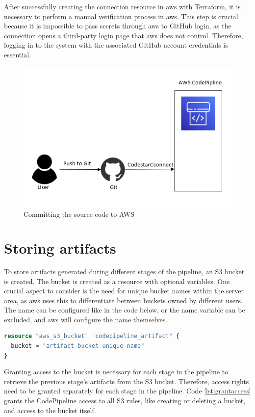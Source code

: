 After successfully creating the connection resource in \acrshort{aws} with Terraform, it is necessary to perform a manual verification process in \acrshort{aws}. This step is crucial because it is impossible to pass secrets through \acrshort{aws} to GitHub login, as the connection opens a third-party login page that \acrshort{aws} does not control. Therefore, logging in to the system with the associated GitHub account credentials is essential.

\vspace{2mm}
\begin{figure}[H]
    \centering
    \includegraphics[width=0.6\columnwidth]{Images/aws-piplin-2-1.png}
    \caption{Committing the source code to AWS}
    \label{fig: Committing the source code to AWS}
\end{figure}

\section{Storing artifacts}
To store \gls{artifact}s generated during different stages of the pipeline, an S3 bucket is created. The bucket is created as a resource with optional variables. One crucial aspect to consider is the need for unique bucket names within the server area, as \acrshort{aws} uses this to differentiate between buckets owned by different users. The name can be configured like in the code below, or the name variable can be excluded, and \acrshort{aws} will configure the name themselves.

\vspace{2mm}
\begin{lstlisting}[language=terraform, caption=Create an S3 Bucket, captionpos=b, frame=single]
resource "aws_s3_bucket" "codepipeline_artifact" {
  bucket = "artifact-bucket-unique-name"
}
\end{lstlisting}

Granting access to the bucket is necessary for each stage in the pipeline to retrieve the previous stage's artifacts from the S3 bucket. Therefore, access rights need to be granted separately for each stage in the pipeline. Code \ref{lst:grantaccess} grants the CodePipeline access to all S3 rules, like creating or deleting a bucket, and access to the bucket itself. 

